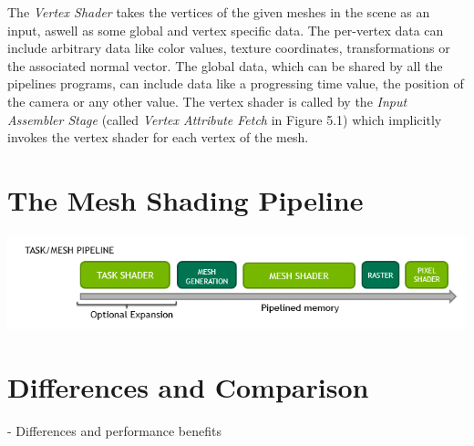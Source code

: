 \noindent
The \emph{Vertex Shader} takes the vertices of the given meshes in the scene as an input, aswell as 
some global and vertex specific data. The per-vertex data can include arbitrary data like color values, 
texture coordinates, transformations or the associated normal vector. The global data, which can be shared
by all the pipelines programs, can include data like a progressing time value, the position of the camera 
or any other value. The vertex shader is called by the \emph{Input Assembler Stage} 
(called \emph{Vertex Attribute Fetch} in Figure 5.1) which implicitly invokes the vertex shader for each 
vertex of the mesh. 






\section{The Mesh Shading Pipeline}


\includegraphics[width=\linewidth]{images/graphics/mesh-rendering-pipeline.png} %





\section{Differences and Comparison}

- Differences and performance benefits

